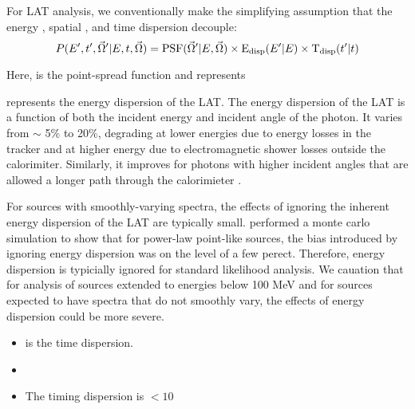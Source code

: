 For LAT analysis, we conventionally make the simplifying assumption that
the energy , spatial , and time dispersion decouple:
\begin{equation}
  P(E',t',\vec\Omega'|E,t,\vec\Omega) = 
  \text{PSF}(\vec\Omega'|E,\vec\Omega) \times \text{E}_\text{disp}(E'|E) \times \text{T}_\text{disp}(t'|t)
\end{equation}

Here, \psf is the point-spread function and represents 

\edisp represents the energy dispersion of the LAT.
The energy dispersion of the LAT is a function of both the
incident energy and incident angle of the photon. It varies
from $\sim$ 5\% to 20\%, degrading at lower energies due to energy
losses in the tracker and at higher energy due to electromagnetic
shower losses outside the calorimiter. Similarly, it improves
for photons with higher incident angles that are 
allowed a longer path through the calorimieter \citep{lat_calibration_2012}.

For sources with smoothly-varying spectra, the effects of ignoring
the inherent energy dispersion of the LAT are typically small.
\cite{lat_calibration_2012} performed a monte carlo simulation to show
that for power-law point-like sources, the bias introduced by ignoring
energy dispersion was on the level of a few perect.  Therefore, energy
dispersion is typicially ignored for standard likelihood analysis.
We cauation that for analysis of sources extended to energies below 100
MeV and for sources expected to have spectra that do not smoothly vary,
the effects of energy dispersion could be more severe.

\begin{itemize}
  \item \tdisp is the time dispersion. 
  \item {}
  \item The timing dispersion is $<10$ \microsecond\cite{lat_mission_atwood_2009}
\end{itemize}

